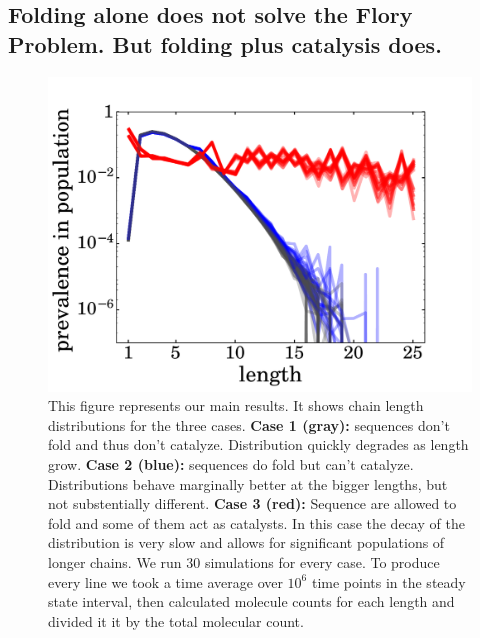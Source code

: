 \documentclass[5p,times]{elsarticle}
\begin{document}
\subsection{Folding alone does not solve the Flory Problem.  But folding plus catalysis does.}
\begin{figure}[h!]
  \centering
  \includegraphics[width=\columnwidth]{pictures/all-three-distrs}
  \caption{\footnotesize{This figure represents our main results. It shows chain length 
distributions for the three cases. \textbf{Case 1 (gray):} sequences don't fold and thus don't 
catalyze. Distribution quickly degrades as length grow. \textbf{Case 2 (blue):} sequences do fold 
but can't catalyze. Distributions behave marginally better at the bigger lengths, but not 
substentially different. \textbf{Case 3 (red):} Sequence are allowed to fold and some of them act 
as catalysts. In this case the decay of the distribution is very slow and allows for significant 
populations of longer chains. We run 30 simulations for every case. To produce every line 
we took a time average over $10^6$ time points in the steady state interval, then calculated 
molecule counts for each length and divided it it by the total molecular count.}}
  \label{fig:sim.flory-fold}
\end{figure}
\end{document}
